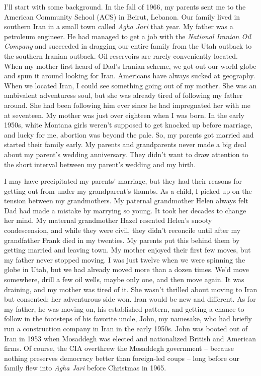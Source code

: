 I'll start with some background. In the fall of 1966, my parents sent me
to the American Community School (ACS) in Beirut, Lebanon. Our family
lived in southern Iran in a small town called \emph{Agha Jari} that
year. My father was a petroleum engineer. He had managed to get a job
with the \emph{National Iranian Oil Company} and succeeded in dragging
our entire family from the Utah outback to the southern Iranian outback.
Oil reservoirs are rarely conveniently located. When my mother first
heard of Dad's Iranian scheme, we got out our world globe and spun it
around looking for Iran. Americans have always sucked at geography. When
we located Iran, I could see something going out of my mother. She was
an ambivalent adventuress soul, but she was already tired of following
my father around. She had been following him ever since he had
impregnated her with me at seventeen. My mother was just over eighteen
when I was born. In the early 1950s, white Montana girls weren't
supposed to get knocked up before marriage, and lucky for me, abortion
was beyond the pale. So, my parents got married and started their family
early. My parents and grandparents never made a big deal about my
parent's wedding anniversary. They didn't want to draw attention to the
short interval between my parent's wedding and my birth.

I may have precipitated my parents' marriage, but they had their reasons
for getting out from under my grandparent's thumbs. As a child, I picked
up on the tension between my grandmothers. My paternal grandmother Helen
always felt Dad had made a mistake by marrying so young. It took her
decades to change her mind. My maternal grandmother Hazel resented
Helen's snooty condescension, and while they were civil, they didn't
reconcile until after my grandfather Frank died in my twenties. My
parents put this behind them by getting married and leaving town. My
mother enjoyed their first few moves, but my father never stopped
moving. I was just twelve when we were spinning the globe in Utah, but
we had already moved more than a dozen times. We'd move somewhere, drill
a few oil wells, maybe only one, and then move again. It was draining,
and my mother was tired of it. She wasn't thrilled about moving to Iran
but consented; her adventurous side won. Iran would be new and
different. As for my father, he was moving on, his established pattern,
and getting a chance to follow in the footsteps of his favorite uncle,
John, my namesake, who had briefly run a construction company in Iran in
the early 1950s. John was booted out of Iran in 1953 when Mosaddegh was
elected and nationalized British and American firms. Of course, the CIA
overthrew the Mosaddegh government -- because nothing preserves
democracy better than foreign-led coups -- long before our family flew
into \emph{Agha Jari} before Christmas in 1965.

